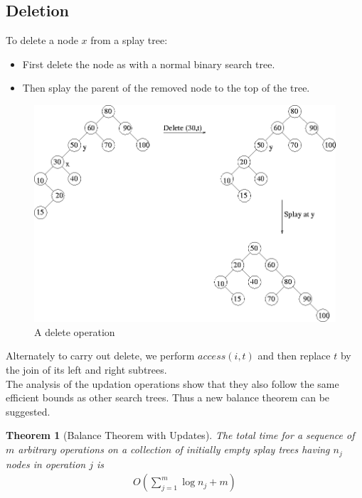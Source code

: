 \documentclass{article}
\newtheorem{thm}{Theorem}
\begin{document}
\subsection{Deletion}
To delete a node $x$ from a splay tree:
\begin{itemize}
\item First delete the node as with a normal binary search tree.
\item Then splay the parent of the removed node to the top of the tree.
\end{itemize}
\begin{figure}[!htpb]
	\label{fig:splay2}
	\begin{center}
		\includegraphics[width=0.6\columnwidth,height=0.6\columnwidth,keepaspectratio]{img201.gif}
	\end{center}
	\caption{A delete operation}
\end{figure}
Alternately to carry out delete, we perform $access(i,t)$ and then replace $t$ by the join of its left and right subtrees.\\
The analysis of the updation operations show that they also follow the same efficient bounds as other search trees. Thus a new balance theorem can be suggested.
\begin{thm}[Balance Theorem with Updates]
\label{thm:upbal}
The total time for a sequence of $m$ arbitrary operations on a collection of initially empty splay trees having $n_j$ nodes in operation $j$ is 
\begin{align}
O(\sum_{j=1}^m \log n_j + m)
\end{align}
\end{thm}
\end{document}
